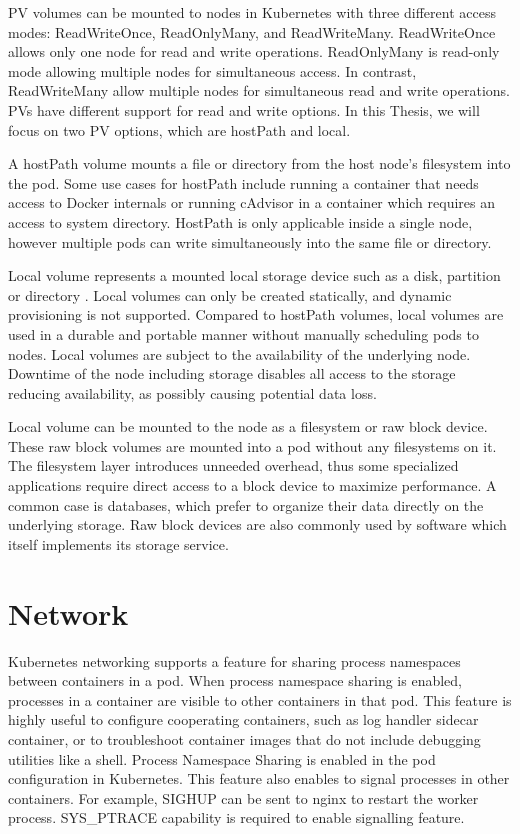 PV volumes can be mounted to nodes in Kubernetes with three different access modes: ReadWriteOnce, ReadOnlyMany, and ReadWriteMany. ReadWriteOnce allows only one node for read and write operations. ReadOnlyMany is read-only mode allowing multiple nodes for simultaneous access. In contrast, ReadWriteMany allow multiple nodes for simultaneous read and write operations. PVs have different support for read and write options. In this Thesis, we will focus on two PV options, which are hostPath and local. \cite{PV} 

A hostPath volume mounts a file or directory from the host node's filesystem into the pod. Some use cases for hostPath include running a container that needs access to Docker internals or running cAdvisor in a container which requires an access to system directory. HostPath is only applicable inside a single node, however multiple pods can write simultaneously into the same file or directory.

Local volume represents a mounted local storage device such as a disk, partition or directory \cite{VolumesKubernetes}. Local volumes can only be created statically, and dynamic provisioning is not supported. Compared to hostPath volumes, local volumes are used in a durable and portable manner without manually scheduling pods to nodes. Local volumes are subject to the availability of the underlying node. Downtime of the node including storage disables all access to the storage reducing availability, as possibly causing potential data loss.

Local volume can be mounted to the node as a filesystem or raw block device. These raw block volumes are mounted into a pod without any filesystems on it. The filesystem layer introduces unneeded overhead, thus some specialized applications require direct access to a block device to maximize performance. A common case is databases, which prefer to organize their data directly on the underlying storage. Raw block devices are also commonly used by software which itself implements its storage service. \cite{RawBlockKubernetes}


\section{Network}

Kubernetes networking supports a feature for sharing process namespaces between containers in a pod. When process namespace sharing is enabled, processes in a container are visible to other containers in that pod. This feature is highly useful to configure cooperating containers, such as log handler sidecar container, or to troubleshoot container images that do not include debugging utilities like a shell. Process Namespace Sharing is enabled in the pod configuration in Kubernetes. This feature also enables to signal processes in other containers. For example, SIGHUP can be sent to nginx to restart the worker process. SYS\_PTRACE capability is required to enable signalling feature. \cite{ShareProcessNamespaceKubernetes}

